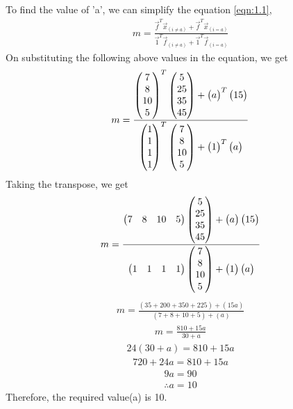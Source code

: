 \documentclass[journal,12pt,twocolumn]{IEEEtran}
\begin{document}
To find the value of 'a', we can simplify the equation \eqref{eqn:1.1},
\begin{align} \label{eqn}
		m = \frac{\vec{f}^T\vec{x}_{(i\neq a)} + \vec{f}^T\vec{x}_{(i=a)}}{\vec{1}^T\vec{f}_{(i\neq a)} + \vec{1}^T\vec{f}_{(i=a)}}
\end{align}
On substituting the following above values in the equation, we get
\begin{align} \label{eqn}
	m = \frac{\begin{pmatrix}7\\8\\10\\5\end{pmatrix}^T\begin{pmatrix}5\\25\\35\\45\end{pmatrix} + \begin{pmatrix}a\end{pmatrix}^T\begin{pmatrix}15\end{pmatrix}}{\begin{pmatrix}1\\1\\1\\1\end{pmatrix}^T\begin{pmatrix}7\\8\\10\\5\end{pmatrix} + \begin{pmatrix}1\end{pmatrix}^T\begin{pmatrix}a\end{pmatrix}}
\end{align}
Taking the transpose, we get
\begin{align} \label{eqn}
	m = \frac{\begin{pmatrix}7&8&10&5\end{pmatrix}\begin{pmatrix}5\\25\\35\\45\end{pmatrix} + \begin{pmatrix}a\end{pmatrix}\begin{pmatrix}15\end{pmatrix}}{\begin{pmatrix}1&1&1&1\end{pmatrix}\begin{pmatrix}7\\8\\10\\5\end{pmatrix} + \begin{pmatrix}1\end{pmatrix}\begin{pmatrix}a\end{pmatrix}}
\end{align}
\begin{align} \label{eqn}
	m = \frac{(35 + 200 + 350 + 225) + (15a)}{(7 + 8 + 10 + 5) + (a)}
\end{align}
\begin{align} \label{eqn}
	m = \frac{810 + 15a}{30 + a}
\end{align}
	\begin{align} \label{eqn}
		24(30 + a) = 810 + 15a 
	\end{align}
	\begin{align} \label{eqn}
		720 + 24a = 810 + 15a
	\end{align}
	\begin{align} \label{eqn}
		9a = 90
	\end{align}
	\begin{align} \label{eqn}
		\therefore a = 10
	\end{align}
	Therefore, the required value(a) is 10.
\end{document}
